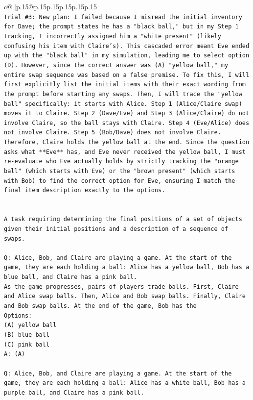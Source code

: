\documentclass{article}
\begin{document}
{\begin{supertabular}{c@{$\;$}|p{.15\linewidth}@{}p{.15\linewidth}p{.15\linewidth}p{.15\linewidth}p{.15\linewidth}p{.15\linewidth}}
{{{\\ 
\texttt{Trial \#3: New plan: I failed because I misread the initial inventory for Dave; the prompt states he has a "black ball," but in my Step 1 tracking, I incorrectly assigned him a "white present" (likely confusing his item with Claire's). This cascaded error meant Eve ended up with the "black ball" in my simulation, leading me to select option (D). However, since the correct answer was (A) "yellow ball," my entire swap sequence was based on a false premise. To fix this, I will first explicitly list the initial items with their exact wording from the prompt before starting any swaps. Then, I will trace the "yellow ball" specifically: it starts with Alice. Step 1 (Alice/Claire swap) moves it to Claire. Step 2 (Dave/Eve) and Step 3 (Alice/Claire) do not involve Claire, so the ball stays with Claire. Step 4 (Eve/Alice) does not involve Claire. Step 5 (Bob/Dave) does not involve Claire. Therefore, Claire holds the yellow ball at the end. Since the question asks what **Eve** has, and Eve never received the yellow ball, I must re{-}evaluate who Eve actually holds by strictly tracking the "orange ball" (which starts with Eve) or the "brown present" (which starts with Bob) to find the correct option for Eve, ensuring I match the final item description exactly to the options.} \\
\\ 
\\ 
\texttt{A task requiring determining the final positions of a set of objects given their initial positions and a description of a sequence of swaps.} \\
\\ 
\texttt{Q: Alice, Bob, and Claire are playing a game. At the start of the game, they are each holding a ball: Alice has a yellow ball, Bob has a blue ball, and Claire has a pink ball.} \\
\texttt{As the game progresses, pairs of players trade balls. First, Claire and Alice swap balls. Then, Alice and Bob swap balls. Finally, Claire and Bob swap balls. At the end of the game, Bob has the} \\
\texttt{Options:} \\
\texttt{(A) yellow ball} \\
\texttt{(B) blue ball} \\
\texttt{(C) pink ball} \\
\texttt{A: (A)} \\
\\ 
\texttt{Q: Alice, Bob, and Claire are playing a game. At the start of the game, they are each holding a ball: Alice has a white ball, Bob has a purple ball, and Claire has a pink ball.} \\
}}}
\end{supertabular}}
\end{document}
